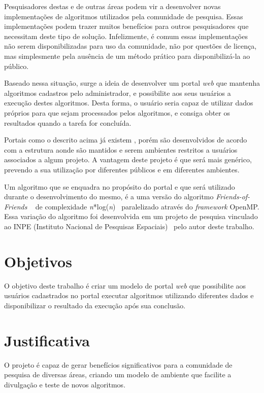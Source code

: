 \documentclass[tg]{mdtufsm}
\begin{document}
Pesquisadores destas e de outras áreas podem vir a desenvolver novas implementações de algoritmos utilizados pela comunidade de pesquisa. Essas implementações podem trazer muitos benefícios para outros pesquisadores que necessitam deste tipo de solução. Infelizmente, é comum essas implementações não serem disponibilizadas para uso da comunidade, não por questões de licença, mas simplesmente pela ausência de um método prático para disponibilizá-la ao público.

Baseado nessa situação, surge a ideia de desenvolver um portal \emph{web} que mantenha algoritmos cadastros pelo administrador, e possibilite aos seus usuários a execução destes algoritmos. Desta forma, o usuário seria capaz de utilizar dados próprios para que sejam processados pelos algoritmos, e consiga obter os resultados quando a tarefa for concluída.

Portais como o descrito acima já existem \cite{nesi}, porém são desenvolvidos de acordo com a estrutura aonde são mantidos e serem ambientes restritos a usuários associados a algum projeto. A vantagem deste projeto é que será mais genérico, prevendo a sua utilização por diferentes públicos e em diferentes ambientes.

Um algoritmo que se enquadra no propósito do portal e que será utilizado durante o desenvolvimento do mesmo, é a uma versão do algoritmo \emph{Friends-of-Friends} \cite{friendsalg}~ de complexidade \emph{n}*log(\emph{n})~ paralelizado através do \emph{framework} OpenMP. Essa variação do algoritmo foi desenvolvida em um projeto de pesquisa vinculado ao INPE (Instituto Nacional de Pesquisas Espaciais)~ pelo autor deste trabalho.

\section{Objetivos}

O objetivo deste trabalho é criar um modelo de portal \emph{web} que possibilite aos usuários cadastrados no portal executar algoritmos utilizando diferentes dados e disponibilizar o resultado da execução após sua conclusão.

\section{Justificativa}

O projeto é capaz de gerar benefícios significativos para a comunidade de pesquisa de diversas áreas, criando um modelo de ambiente que facilite a divulgação e teste de novos algoritmos.
\end{document}
